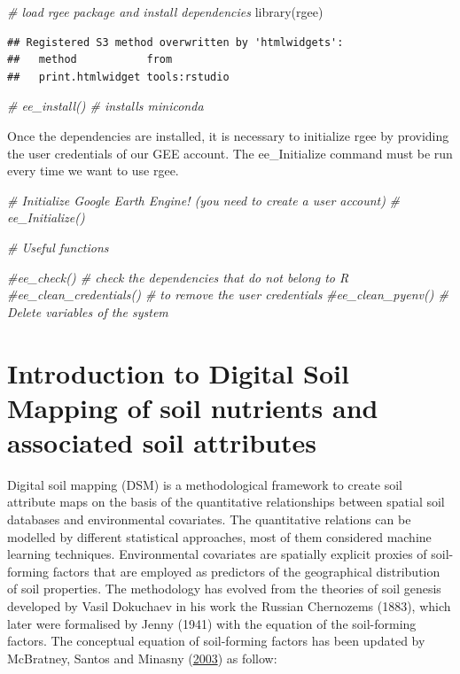 \documentclass[
  10pt,
  b5paper,
  oneside]{book}
\newenvironment{Shaded}{\begin{snugshade}}{\end{snugshade}}
\newcommand{\CommentTok}[1]{\textcolor[rgb]{0.56,0.35,0.01}{\textit{#1}}}
\newcommand{\FunctionTok}[1]{\textcolor[rgb]{0.00,0.00,0.00}{#1}}
\newcommand{\NormalTok}[1]{#1}
\begin{document}
\begin{Shaded}
\begin{Highlighting}[]
\CommentTok{\# load rgee package and install dependencies}
\FunctionTok{library}\NormalTok{(rgee)}
\end{Highlighting}
\end{Shaded}

\begin{verbatim}
## Registered S3 method overwritten by 'htmlwidgets':
##   method           from         
##   print.htmlwidget tools:rstudio
\end{verbatim}

\begin{Shaded}
\begin{Highlighting}[]
\CommentTok{\# ee\_install() \# installs miniconda}
\end{Highlighting}
\end{Shaded}

Once the dependencies are installed, it is necessary to initialize rgee by providing the user credentials of our GEE account. The ee\_Initialize command must be run every time we want to use rgee.

\begin{Shaded}
\begin{Highlighting}[]
\CommentTok{\# Initialize Google Earth Engine! (you need to create a user account)}
\CommentTok{\# ee\_Initialize()}


\CommentTok{\# Useful functions}

\CommentTok{\#ee\_check() \# check the dependencies that do not belong to R}
\CommentTok{\#ee\_clean\_credentials() \# to remove the user credentials}
\CommentTok{\#ee\_clean\_pyenv() \# Delete variables of the system}
\end{Highlighting}
\end{Shaded}

\hypertarget{introduction-to-digital-soil-mapping-of-soil-nutrients-and-associated-soil-attributes}{%
\chapter{Introduction to Digital Soil Mapping of soil nutrients and associated soil attributes}\label{introduction-to-digital-soil-mapping-of-soil-nutrients-and-associated-soil-attributes}}

Digital soil mapping (DSM) is a methodological framework to create soil attribute maps on the basis of the quantitative relationships between spatial soil databases and environmental covariates. The quantitative relations can be modelled by different statistical approaches, most of them considered machine learning techniques. Environmental covariates are spatially explicit proxies of soil-forming factors that are employed as predictors of the geographical distribution of soil properties. The methodology has evolved from the theories of soil genesis developed by Vasil Dokuchaev in his work the Russian Chernozems (1883), which later were formalised by Jenny (1941) with the equation of the soil-forming factors. The conceptual equation of soil-forming factors has been updated by McBratney, Santos and Minasny (\protect\hyperlink{ref-McBratney2003}{2003}) as follow:
\end{document}
